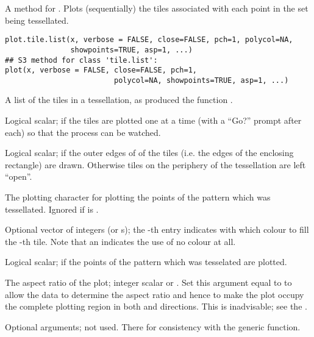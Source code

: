 \begin{Description}\relax
A method for .  Plots (sequentially)
the tiles associated with each point in the set being tessellated.
\end{Description}
\begin{Usage}
\begin{verbatim}
plot.tile.list(x, verbose = FALSE, close=FALSE, pch=1, polycol=NA,
               showpoints=TRUE, asp=1, ...)
## S3 method for class 'tile.list':
plot(x, verbose = FALSE, close=FALSE, pch=1,
                         polycol=NA, showpoints=TRUE, asp=1, ...)
\end{verbatim}
\end{Usage}
\begin{Arguments}
\begin{ldescription}
\item[\code{x}] A list of the tiles in a tessellation, as produced
the function .
\item[\code{verbose}] Logical scalar; if  the tiles are
plotted one at a time (with a ``Go?'' prompt after each)
so that the process can be watched.
\item[\code{close}] Logical scalar; if  the outer edges of
of the tiles (i.e. the edges of the enclosing rectangle)
are drawn.  Otherwise tiles on the periphery of the
tessellation are left ``open''.
\item[\code{pch}] The plotting character for plotting the points of the
pattern which was tessellated.  Ignored if 
is .
\item[\code{polycol}] Optional vector of integers (or s);
the -th entry indicates with which colour to fill
the -th tile.  Note that an  indicates
the use of no colour at all.
\item[\code{showpoints}] Logical scalar; if  the points of
the pattern which was tesselated are plotted.
\item[\code{asp}] The aspect ratio of the plot; integer scalar or
.  Set this argument equal to  to allow the data
to determine the aspect ratio and hence to make the plot occupy the
complete plotting region in both  and  directions.
This is inadvisable; see the .
\item[\code{...}] Optional arguments; not used.  There for consistency
with the generic  function.
\end{ldescription}
\end{Arguments}
